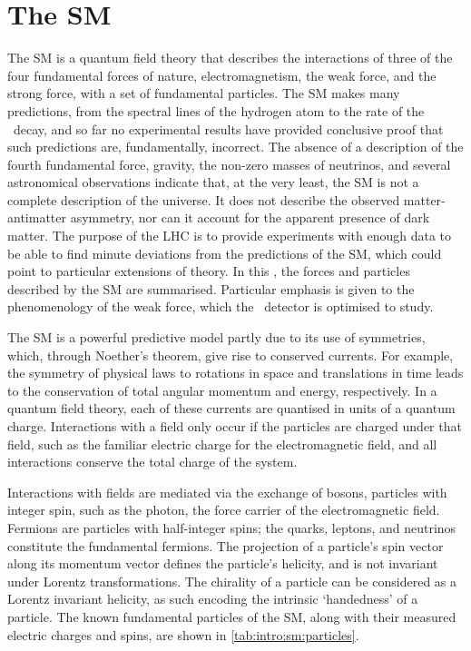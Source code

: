 \chapter{The \acl{SM}}
\label{chap:intro:sm}

The \acf{SM} is a quantum field theory that describes the interactions of three 
of the four fundamental forces of nature, electromagnetism, the weak force, and 
the strong force, with a set of fundamental particles.
The \ac{SM} makes many predictions, from the spectral lines of the hydrogen  
atom to the rate of the \BsTomumu\ decay, and so far no experimental results 
have provided conclusive proof that such predictions are, fundamentally, 
incorrect.
The absence of a description of the fourth fundamental force, gravity, the 
non-zero masses of neutrinos, and several astronomical observations indicate 
that, at the very least, the \ac{SM} is not a complete description of the 
universe.
It does not describe the observed matter-antimatter asymmetry, nor can it 
account for the apparent presence of dark matter.
The purpose of the \ac{LHC} is to provide experiments with enough data to be 
able to find minute deviations from the predictions of the \ac{SM}, which could 
point to particular extensions of theory.
In this , the forces and particles described by the 
\ac{SM} are summarised.
Particular emphasis is given to the phenomenology of the weak force, which the 
\lhcb\ detector is optimised to study.

The \ac{SM} is a powerful predictive model partly due to its use of symmetries, 
which, through Noether's theorem, give rise to conserved currents.
For example, the symmetry of physical laws to rotations in space and 
translations in time leads to the conservation of total angular momentum and 
energy, respectively.
In a quantum field theory, each of these currents are quantised in units of a 
quantum charge.
Interactions with a field only occur if the particles are charged under that 
field, such as the familiar electric charge for the electromagnetic field, and 
all interactions conserve the total charge of the system.

Interactions with fields are mediated via the exchange of bosons, particles 
with integer spin, such as the photon, the force carrier of the electromagnetic 
field.
Fermions are particles with half-integer spins; the quarks, leptons, and 
neutrinos constitute the fundamental fermions.
The projection of a particle's spin vector along its momentum vector defines 
the particle's helicity, and is not invariant under Lorentz transformations.
The chirality of a particle can be considered as a Lorentz invariant helicity, 
as such encoding the intrinsic `handedness' of a particle.
The known fundamental particles of the \ac{SM}, along with their measured 
electric charges and spins, are shown in \cref{tab:intro:sm:particles}.

